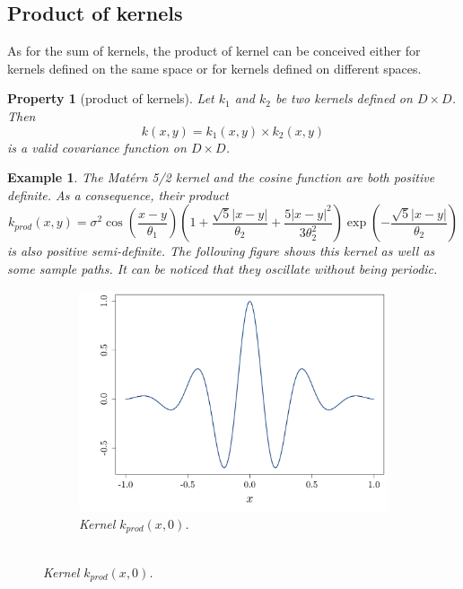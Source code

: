 \documentclass[twoside,openright]{report}
\newtheorem{property}{Property}
\newtheorem{example}{Example}
\begin{document}
\subsection{Product of kernels}
As for the sum of kernels, the product of kernel can be conceived either for kernels defined on the same space or for kernels defined on different spaces.
\begin{property}[product of kernels]
	Let $k_1$ and $k_2$ be two kernels defined on $D \times D$. Then 
	\begin{equation}
		k(x,y) = k_1(x,y) \times k_2(x,y)
	\end{equation}
	is a valid covariance function on $D \times D$.
\end{property}
\begin{example}
	The Mat\'ern 5/2 kernel and the cosine function are both positive definite. As a consequence, their product 
	\begin{equation}
	k_{prod}(x,y) = \sigma^2 \cos \left( \frac{x-y}{\theta_1} \right) \left(1 + \frac{\sqrt{5}|x-y|}{\theta_2} + \frac{5|x-y|^2}{3 \theta_2^2} \right) \exp \left(- \frac{\sqrt{5}|x-y|}{\theta_2} \right)
	\end{equation}
	is also positive semi-definite. The following figure shows this kernel as well as some sample paths. It can be noticed that they oscillate without being periodic.
	\begin{figure}[ht!]
        \centering
        \begin{subfigure}[t]{0.45\textwidth}
                \includegraphics[width=\textwidth]{figures/ch5_prodKern}
                \caption{Kernel $k_{prod}(x,0)$. \\ \ }

\end{subfigure}
\end{figure}
\end{example}
\end{document}
